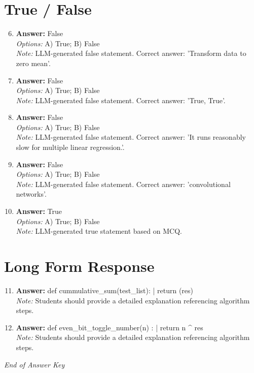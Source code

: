 \documentclass[12pt]{article}
\begin{document}
\section*{True / False}
\begin{enumerate}[label=\arabic*.]
\setcounter{enumi}{5}
\item \textbf{Answer:} False
\\ \textit{Options:} A) True; B) False
\\ \textit{Note:} LLM-generated false statement. Correct answer: 'Transform data to zero mean'.
\item \textbf{Answer:} False
\\ \textit{Options:} A) True; B) False
\\ \textit{Note:} LLM-generated false statement. Correct answer: 'True, True'.
\item \textbf{Answer:} False
\\ \textit{Options:} A) True; B) False
\\ \textit{Note:} LLM-generated false statement. Correct answer: 'It runs reasonably slow for multiple linear regression.'.
\item \textbf{Answer:} False
\\ \textit{Options:} A) True; B) False
\\ \textit{Note:} LLM-generated false statement. Correct answer: 'convolutional networks'.
\item \textbf{Answer:} True
\\ \textit{Options:} A) True; B) False
\\ \textit{Note:} LLM-generated true statement based on MCQ.
\end{enumerate}

\section*{Long Form Response}
\begin{enumerate}[label=\arabic*.]
\setcounter{enumi}{10}
\item \textbf{Answer:} def cummulative\_sum(test\_list): | return (res)
\\ \textit{Note:} Students should provide a detailed explanation referencing algorithm steps.
\item \textbf{Answer:} def even\_bit\_toggle\_number(n) : | return n ^ res
\\ \textit{Note:} Students should provide a detailed explanation referencing algorithm steps.
\end{enumerate}

\vfill
\noindent\textit{End of Answer Key}
\end{document}
